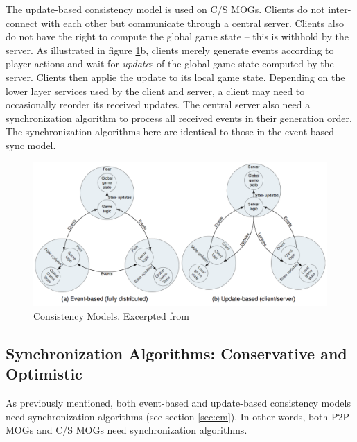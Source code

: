\documentclass{article}
\begin{document}
The update-based consistency model is used on C/S MOGs. Clients do not inter-connect with each other but communicate through a central server. Clients also do not have the right to compute the global game state -- this is withhold by the server. As illustrated in figure \ref{fig:cm}b, clients merely generate events according to player actions and wait for \emph{update}s of the global game state computed by the server. Clients then applie the update to its local game state. Depending on the lower layer services used by the client and server, a client may need to occasionally reorder its received updates. The central server also need a synchronization algorithm to process all received events in their generation order. The synchronization algorithms here are identical to those in the event-based sync model.

\begin{figure}
\begin{center}
\includegraphics[scale=0.3]{images/sm.png}
\caption{Consistency Models. Excerpted from \cite{Gilmore12}}
\label{fig:cm}
\end{center}
\end{figure}

\subsection{Synchronization Algorithms: Conservative and Optimistic}
\label{sec:sa}
As previously mentioned, both event-based and update-based consistency models need synchronization algorithms (see section \ref{sec:cm}). In other words, both P2P MOGs and C/S MOGs need synchronization algorithms.
\end{document}

